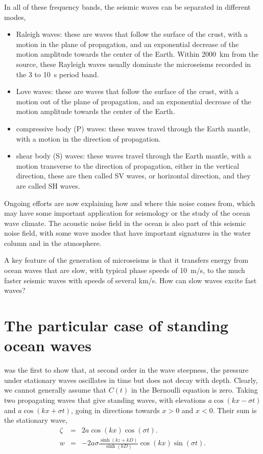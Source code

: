 In all of these frequency bands, the seismic waves can be separated in different modes, 
\begin{itemize}
\item Raleigh waves: these are waves that follow the surface of the crust, with a motion in the plane of propagation, and an exponential decrease of the 
motion amplitude towards the center of the  Earth. Within 2000~km from the source, these Rayleigh waves usually dominate the microseisms recorded in the 3 to 10~s period band. 
\item Love waves: these are waves that follow the surface of the crust, with a motion out of the plane of propagation, and an exponential decrease of the 
motion amplitude towards the center of the  Earth. 
\item compressive body (P) waves: these waves travel through the Earth mantle, with a motion in the direction of propagation. 
\item shear body (S) waves: these waves travel through the Earth mantle, with a motion transverse to the direction of propagation, either in the vertical direction,
these are then called SV waves, or horizontal direction, and they are called SH waves.
\end{itemize}

Ongoing efforts are now explaining how and where this noise comes from, which may have 
some important application for seismology or the study of the ocean wave climate. The acoustic noise field in the ocean is also part of 
this seismic noise field, with some wave modes that have important signatures in the water column and in the atmosphere.

A key feature of the generation of microseisms is that it transfers energy 
from ocean waves that are slow, with typical phase speeds of  10~m/s, to the much faster seismic waves with speeds of several km/s. 
How can slow waves excite fast waves? 

\section{The particular case of standing ocean waves}
\cite{Miche1944b} was the first to show that, at second order in the wave steepness, the pressure under stationary waves oscillates in time but does not decay with depth. Clearly, 
we cannot generally assume that $C(t)$ in the Bernoulli equation is zero.  
Taking two propagating waves that give standing waves, with elevations $a \cos(kx - \sigma t)$ and $a \cos(kx + \sigma t)$, going in directions towards  $x>0$ and $x<0$. Their sum is 
the stationary wave,
\begin{eqnarray}
 \zeta &=& 2 a \cos(kx) \cos (\sigma t).\\
 w &=& - 2 a \sigma \frac{\sinh(kz + kD)}{\sinh(kD)} \cos(kx) \sin (\sigma t).\\
\end{eqnarray}

